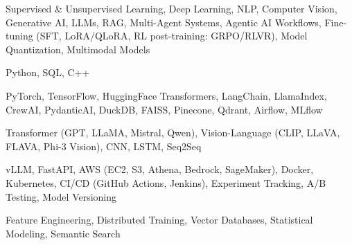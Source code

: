 \documentclass[letter,10pt]{article}
\begin{document}
 Supervised \& Unsupervised Learning, Deep Learning, NLP, Computer Vision, Generative AI, LLMs, RAG, Multi-Agent Systems, Agentic AI Workflows, Fine-tuning (SFT, LoRA/QLoRA, RL post-training: GRPO/RLVR), Model Quantization, Multimodal Models\par\vspace{2pt}

 Python, SQL, C++\par\vspace{2pt}

 PyTorch, TensorFlow, HuggingFace Transformers, LangChain, LlamaIndex, CrewAI, PydanticAI, DuckDB, FAISS, Pinecone, Qdrant, Airflow, MLflow\par\vspace{2pt}

 Transformer (GPT, LLaMA, Mistral, Qwen), Vision-Language (CLIP, LLaVA, FLAVA, Phi-3 Vision), CNN, LSTM, Seq2Seq\par\vspace{2pt}

 vLLM, FastAPI, AWS (EC2, S3, Athena, Bedrock, SageMaker), Docker, Kubernetes, CI/CD (GitHub Actions, Jenkins), Experiment Tracking, A/B Testing, Model Versioning\par\vspace{2pt}

 Feature Engineering, Distributed Training, Vector Databases, Statistical Modeling, Semantic Search
\end{document}
